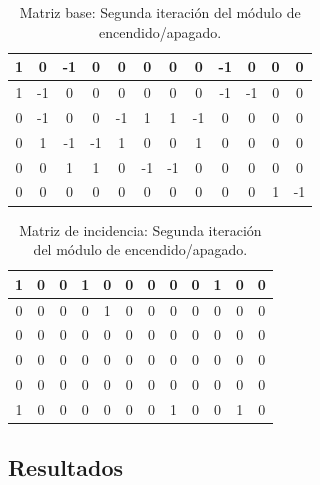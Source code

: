 \begin{table}[H]
    \centering
    \begin{tabular}{|c|c|c|c|c|c|c|c|c|c|c|c|}
        \hline
        1 & 0  & -1 & 0  & \cellcolor{lightgray}0  & 0  & 0  & 0  & -1 & 0  & 0 & 0  \\
        \hline
        1 & -1 & 0  & 0  & \cellcolor{lightgray}0  & 0  & 0  & 0  & -1 & -1 & 0 & 0  \\
        \hline
        0 & -1 & 0  & 0  & \cellcolor{lightgray}-1 & 1  & 1  & -1 & 0  & 0  & 0 & 0  \\
        \hline
        0 & 1  & -1 & -1 & \cellcolor{lightgray}1  & 0  & 0  & 1  & 0  & 0  & 0 & 0  \\
        \hline
        0 & 0  & 1  & 1  & \cellcolor{lightgray}0  & -1 & -1 & 0  & 0  & 0  & 0 & 0  \\
        \hline
        0 & 0  & 0  & 0  & \cellcolor{lightgray}0  & 0  & 0  & 0  & 0  & 0  & 1 & -1 \\
        \hline
    \end{tabular}
    \caption{Matriz base: Segunda iteración del módulo de encendido/apagado.}
    \label{tabla:matriz_base_post_2}
\end{table}

\begin{table}[H]
    \centering
    \begin{tabular}{|c|c|c|c|c|c|c|c|c|c|c|c|}
        \hline
        1 & 0 & 0 & 1 & \cellcolor{lightgray}0 & 0 & 0 & 0 & 0 & 1 & 0 & 0 \\
        \hline
        0 & 0 & 0 & 0 & \cellcolor{lightgray}1 & 0 & 0 & 0 & 0 & 0 & 0 & 0 \\
        \hline
        0 & 0 & 0 & 0 & \cellcolor{lightgray}0 & 0 & 0 & 0 & 0 & 0 & 0 & 0 \\
        \hline
        0 & 0 & 0 & 0 & \cellcolor{lightgray}0 & 0 & 0 & 0 & 0 & 0 & 0 & 0 \\
        \hline
        0 & 0 & 0 & 0 & \cellcolor{lightgray}0 & 0 & 0 & 0 & 0 & 0 & 0 & 0 \\
        \hline
        1 & 0 & 0 & 0 & \cellcolor{lightgray}0 & 0 & 0 & 1 & 0 & 0 & 1 & 0 \\
        \hline
    \end{tabular}
    \caption{Matriz de incidencia: Segunda iteración del módulo de encendido/apagado.}
    \label{tabla:matriz_incidencia_post_2}
\end{table}

\subsection{Resultados}

